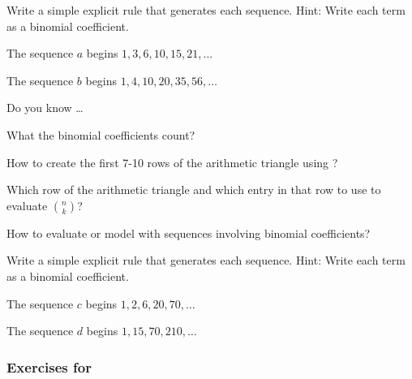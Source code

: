 \begin{exer}[\exerU] %
\label{exer_nte_binom_coeffs}
    Write a simple explicit rule that generates each sequence. Hint: Write each term as a binomial coefficient. 
        \begin{exerpart}
            \item The sequence $a$ begins $1, 3, 6, 10, 15, 21, \ldots$
            \item The sequence $b$ begins $1, 4, 10, 20, 35, 56, \ldots$
        \end{exerpart}
\end{exer}

\begin{exer}[\exerR] %
\label{exer_dyk_arith_tri}
    Do you know \ldots
        \begin{exerpart}
            \item What the binomial coefficients count?
            \item How to create the first 7-10 rows of the arithmetic triangle using ?
            \item Which row of the arithmetic triangle and which entry in that row to use to evaluate $\binom{n}{k}$?
            \item How to evaluate or model with sequences involving binomial coefficients?
        \end{exerpart}
\end{exer}

\begin{exer}[\exerE] %
\label{exer_nte_binom_coeffs_harder}
    Write a simple explicit rule that generates each sequence. Hint: Write each term as a binomial coefficient.
         \begin{exerpart}
             \item The sequence $c$ begins $1, 2, 6, 20, 70, \ldots$ %
             \item The sequence $d$ begins $1, 15, 70, 210, \ldots$ 
        \end{exerpart}  
\end{exer}


\subsubsection*{Exercises for  \subpascalpatterns}

